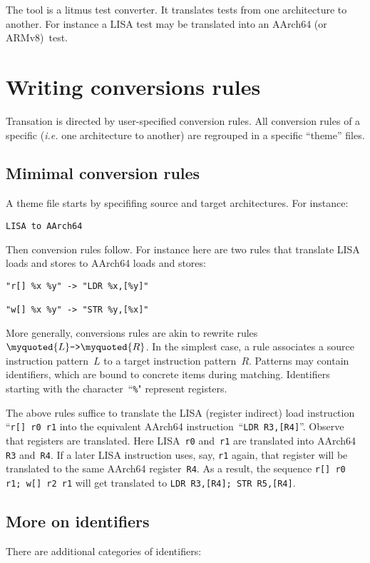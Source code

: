 
The tool \jingle{} is a litmus test converter.
It translates tests from one architecture to another.
For instance a LISA test may be translated into an AArch64 (or ARMv8)~test.


\section{Writing conversions rules}
Transation is directed by user-specified conversion rules.
All conversion rules of a specific (\emph{i.e.} one architecture
to another) are regrouped in a specific ``theme'' files.


\subsection{Mimimal conversion rules}
A theme file starts by specififing source and target architectures.
For instance:
\begin{verbatim}
LISA to AArch64
\end{verbatim}

Then conversion rules follow. For instance here are two rules
that translate LISA loads and stores to AArch64 loads and stores:
\begin{verbatim}
"r[] %x %y" -> "LDR %x,[%y]"

"w[] %x %y" -> "STR %y,[%x]"
\end{verbatim}
More generally, conversions rules are akin to rewrite
rules~$\myquoted{L} \texttt{->} \myquoted{R}$.
In the simplest case,
a rule associates a source instruction pattern~$L$
to a target instruction pattern~$R$.
Patterns may contain identifiers, which are bound to concrete items
during matching.
Identifiers starting with the character~``\verb+%+" represent registers.

The above rules suffice to translate the LISA (register indirect)
load instruction ``\verb+r[] r0 r1+
into the equivalent AArch64 instruction~``\verb+LDR R3,[R4]+''.
Observe that registers are translated.
Here LISA~\verb+r0+ and~\verb+r1+
are translated into  AArch64 \verb+R3+ and~\verb+R4+.
If a later LISA instruction uses, say, \verb+r1+ again,
that register will be translated to the same AArch64 register~\verb+R4+.
As a result, the sequence \verb+r[] r0 r1; w[] r2 r1+ will get
translated to \verb+LDR R3,[R4]; STR R5,[R4]+.


\subsection{More on identifiers}
There are additional categories of identifiers:

